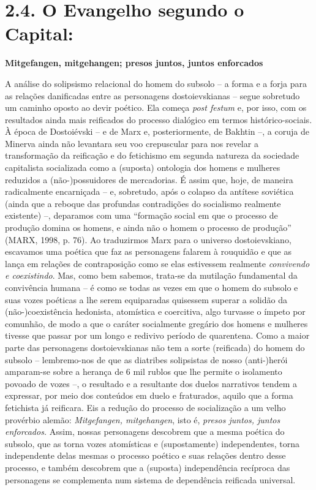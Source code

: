\section{2.4. O Evangelho segundo o Capital:}

\textbf{Mitgefangen, mitgehangen; presos juntos, juntos enforcados }

A análise do solipsismo relacional do homem do subsolo -- a forma e a
forja para as relações danificadas entre as personagens dostoievskianas
-- segue sobretudo um caminho oposto ao devir poético. Ela começa
\emph{post festum} e, por isso, com os resultados ainda mais reificados
do processo dialógico em termos histórico-sociais. À época de
Dostoiévski -- e de Marx e, posteriormente, de Bakhtin --, a coruja de
Minerva ainda não levantara seu voo crepuscular para nos revelar a
transformação da reificação e do fetichismo em segunda natureza da
sociedade capitalista socializada como a (suposta) ontologia dos homens
e mulheres reduzidos a (não-)possuidores de mercadorias. É assim que,
hoje, de maneira radicalmente encarniçada -- e, sobretudo, após o
colapso da antítese soviética (ainda que a reboque das profundas
contradições do socialismo realmente existente) --, deparamos com uma
``formação social em que o processo de produção domina os homens, e
ainda não o homem o processo de produção'' (MARX, 1998, p. 76). Ao
traduzirmos Marx para o universo dostoievskiano, escavamos uma poética
que faz as personagens falarem à rouquidão e que as lança em relações de
contraposição como se elas estivessem realmente \emph{convivendo e
coexistindo}. Mas, como bem sabemos, trata-se da mutilação fundamental
da convivência humana -- é como se todas as vezes em que o homem do
subsolo e suas vozes poéticas a lhe serem equiparadas quisessem superar
a solidão da (não-)coexistência hedonista, atomística e coercitiva, algo
turvasse o ímpeto por comunhão, de modo a que o caráter socialmente
gregário dos homens e mulheres tivesse que passar por um longo e
redivivo período de quarentena. Como a maior parte das personagens
dostoievskianas não tem a sorte (reificada) do homem do subsolo --
lembremo-nos de que as diatribes solipsistas de nosso (anti-)herói
amparam-se sobre a herança de 6 mil rublos que lhe permite o isolamento
povoado de vozes --, o resultado e a resultante dos duelos narrativos
tendem a expressar, por meio dos conteúdos em duelo e fraturados, aquilo
que a forma fetichista já reificara. Eis a redução do processo de
socialização a um velho provérbio alemão: \emph{Mitgefangen,
mitgehangen}, isto é, \emph{presos juntos, juntos enforcados.} Assim,
nossas personagens descobrem que a mesma poética do subsolo, que as
torna vozes atomísticas e (supostamente) independentes, torna
independente delas mesmas o processo poético e suas relações dentro
desse processo, e também descobrem que a (suposta) independência
recíproca das personagens se complementa num sistema de dependência
reificada universal.

